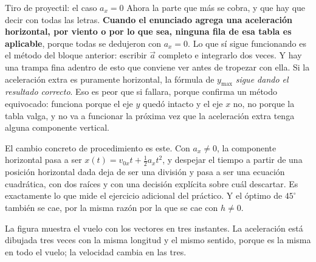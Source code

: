 \documentclass[11pt,openany]{book}
\begin{document}
\begin{bloque}{Tiro de proyectil: el caso $a_x = 0$}
Ahora la parte que más se cobra, y que hay que decir con todas las letras. \textbf{Cuando el enunciado agrega una aceleración horizontal, por viento o por lo que sea, ninguna fila de esa tabla es aplicable}, porque todas se dedujeron con $a_x = 0$. Lo que sí sigue funcionando es el método del bloque anterior: escribir $\vec a$ completo e integrarlo dos veces. Y hay una trampa fina adentro de esto que conviene ver antes de tropezar con ella. Si la aceleración extra es puramente horizontal, la fórmula de $y_{\max}$ \emph{sigue dando el resultado correcto}. Eso es peor que si fallara, porque confirma un método equivocado: funciona porque el eje $y$ quedó intacto y el eje $x$ no, no porque la tabla valga, y no va a funcionar la próxima vez que la aceleración extra tenga alguna componente vertical.

El cambio concreto de procedimiento es este. Con $a_x \neq 0$, la componente horizontal pasa a ser $x(t) = v_{0x}t + \tfrac12 a_x t^2$, y despejar el tiempo a partir de una posición horizontal dada deja de ser una división y pasa a ser una ecuación cuadrática, con dos raíces y con una decisión explícita sobre cuál descartar. Es exactamente lo que mide el ejercicio adicional del práctico. Y el óptimo de $45^\circ$ también se cae, por la misma razón por la que se cae con $h \neq 0$.

La figura muestra el vuelo con los vectores en tres instantes. La aceleración está dibujada tres veces con la misma longitud y el mismo sentido, porque es la misma en todo el vuelo; la velocidad cambia en las tres.

\begin{center}
\end{center}


\end{bloque}
\end{document}
